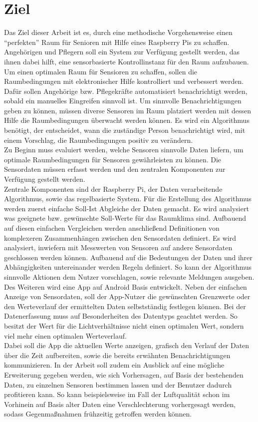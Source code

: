 \section{Ziel}
Das Ziel dieser Arbeit ist es, durch eine methodische Vorgehensweise einen ``perfekten'' Raum für Senioren mit Hilfe eines Raspberry Pis zu schaffen. Angehörigen und Pflegern soll ein System zur Verfügung gestellt werden, das ihnen dabei hilft, eine sensorbasierte Kontrollinstanz für den Raum aufzubauen.\\
Um einen optimalen Raum für Sensioren zu schaffen, sollen die Raumbedingungen mit elektronischer Hilfe kontrolliert und verbessert werden.
Dafür sollen Angehörige bzw. Pflegekräfte automatisiert benachrichtigt werden, sobald ein manuelles Eingreifen sinnvoll ist.
Um sinnvolle Benachrichtigungen geben zu können, müssen diverse Sensoren im Raum platziert werden mit dessen Hilfe die Raumbedingungen überwacht werden können. Es wird ein Algorithmus benötigt, der entscheidet, wann die zuständige Person benachrichtigt wird, mit einem Vorschlag, die Raumbedingungen positiv zu verändern.\\
Zu Beginn muss evaluiert werden, welche Sensoren sinnvolle Daten liefern, um optimale Raumbedingungen für Sensoren gewährleisten zu können. Die Sensordaten müssen erfasst werden und den zentralen Komponenten zur Verfügung gestellt werden.\\
Zentrale Komponenten sind der Raspberry Pi, der Daten verarbeitende Algorithmus, sowie das regelbasierte System.
Für die Erstellung des Algorithmus werden zuerst einfache Soll-Ist Abgleiche der Daten gemacht. Es wird analysiert was geeignete bzw. gewünschte Soll-Werte für das Raumklima sind. Aufbauend auf diesen einfachen Vergleichen werden anschließend Definitionen von komplexeren Zusammenhängen zwischen den Sensordaten definiert. Es wird analysiert, inwiefern mit Messwerten von Sensoren auf andere Sensordaten geschlossen werden können. Aufbauend auf die Bedeutungen der Daten und ihrer Abhängigkeiten untereinander werden Regeln definiert. So kann der Algorithmus sinnvolle Aktionen dem Nutzer vorschlagen, sowie relevante Meldungen ausgeben.\\
Des Weiteren wird eine App auf Android Basis entwickelt. Neben der einfachen Anzeige von Sensordaten, soll der App-Nutzer die gewünschten Grenzwerte oder den Werteverlauf der ermittelten Daten selbstständig festlegen können. Bei der Datenerfassung muss auf Besonderheiten des Datentyps geachtet werden. So besitzt der Wert für die Lichtverhältnisse nicht einen optimalen Wert, sondern viel mehr einen optimalen Werteverlauf.\\
Dabei soll die App die aktuellen Werte anzeigen, grafisch den Verlauf der Daten über die Zeit aufbereiten, sowie die bereits erwähnten Benachrichtigungen kommunizieren.
In der Arbeit soll zudem ein Ausblick auf eine mögliche Erweiterung gegeben werden, wie sich Vorhersagen, auf Basis der bestehenden Daten, zu einzelnen Sensoren bestimmen lassen und der Benutzer dadurch profitieren kann. So kann beispielsweise im Fall der Luftqualität schon im Vorhinein auf Basis alter Daten eine Verschlechterung vorhergesagt werden, sodass Gegenmaßnahmen frühzeitig getroffen werden können.
